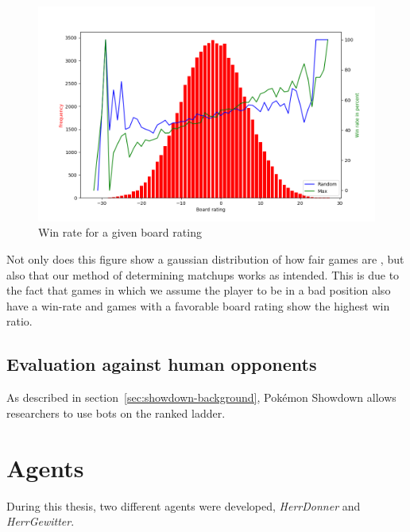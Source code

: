 \begin{figure}[h]
	\centering
	\includegraphics[width=\textwidth]{images/boardrating.png}
	\caption{Win rate for a given board rating}
	\label{fig:wr-board-rating}
\end{figure}
Not only does this figure show a gaussian distribution of how fair games are ,
but also that our method of determining matchups works as intended. This is due to the fact that games 
in which we assume the player to be in a bad position also have a win-rate and games with a favorable
board rating show the highest win ratio.

\subsection{Evaluation against human opponents}
As described in section~\ref{sec:showdown-background}, Pokémon Showdown allows researchers to use bots on the
ranked ladder. 

\section{Agents}
During this thesis, two different agents were developed, \textit{HerrDonner} and \textit{HerrGewitter}.

